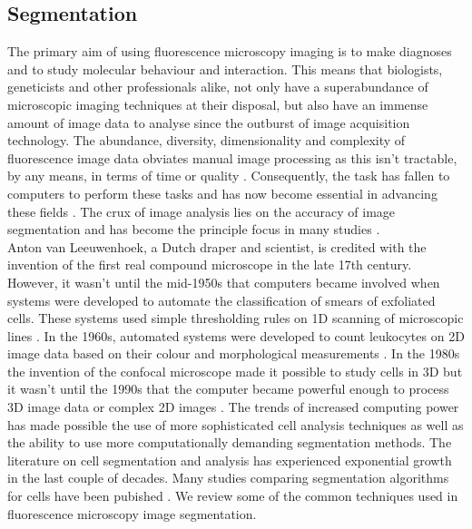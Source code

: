 \subsection{Segmentation}
The primary aim of using fluorescence microscopy imaging is to make diagnoses and to study molecular behaviour and interaction.
This means that biologists, geneticists and other professionals alike, not only have a superabundance of microscopic imaging techniques at their disposal, but also have an immense amount of image data to analyse since the outburst of image acquisition technology.
The abundance, diversity, dimensionality and complexity of fluorescence image data obviates manual image processing as this isn't tractable, by any means, in terms of time or quality \citep{Meijering2012,Ryan2016}.
Consequently, the task has fallen to computers to perform these tasks and has now become essential in advancing these fields \citep{Alberts2007,Vonesch2006}.
The crux of image analysis lies on the accuracy of image segmentation and has become the principle focus in many studies \citep{Bengtsson2004}.\\

Anton van Leeuwenhoek, a Dutch draper and scientist, is credited with the invention of the first real compound microscope in the late 17th century.
However, it wasn't until the mid-1950s that computers became involved when systems were developed to automate the classification of smears of exfoliated cells.
These systems used simple thresholding rules on 1D scanning of microscopic lines \citep{Tolles1955}.
In the 1960s, automated systems were developed to count leukocytes on 2D image data based on their colour and morphological measurements \citep{Prewitt1966}.
In the 1980s the invention of the confocal microscope made it possible to study cells in 3D but it wasn't until the 1990s that the computer became powerful enough to process 3D image data or complex 2D images \citep{Gurcan2009}.
The trends of increased computing power has made possible the use of more sophisticated cell analysis techniques as well as the ability to use more computationally demanding segmentation methods.
The literature on cell segmentation and analysis has experienced exponential growth in the last couple of decades.
Many studies comparing segmentation algorithms for cells have been pubished \citep{Dima2011,Pincus2007,Coelho2009}.
We review some of the common techniques used in fluorescence microscopy image segmentation.

